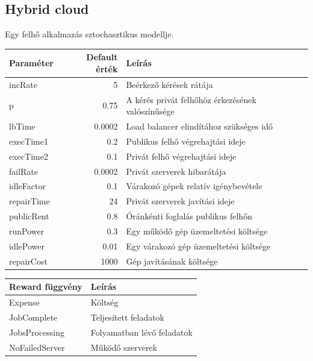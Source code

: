 \subsection{Hybrid cloud}

Egy felhő alkalmazás sztochasztikus modellje.
\begin{center}
	\begin{tabular}{lrl}
		\textbf{\textbf{Paraméter}} & \textbf{Default érték} & \textbf{Leírás} \\
		\hline
		incRate & 5& Beérkező kérések rátája\\
		p & 0.75 & A kérés privát felhőhöz érkezésének valószínűsége\\
		lbTime & 0.0002 & Load balancer elindítához szükséges idő\\
		execTime1 & 0.2 & Publikus felhő végrehajtási ideje\\
		execTime2 & 0.1 & Privát felhő végrehajtási ideje\\
		failRate & 0.0002 & Privát szerverek hibarátája\\
		idleFactor & 0.1 & Várakozó gépek relatív igénybevétele\\
		repairTime & 24 & Privát szerverek javítási ideje\\
		publicRent & 0.8 & Óránkénti foglalás publikus felhőn\\
		runPower & 0.3 & Egy működő gép üzemeltetési költsége\\
		idlePower & 0.01 & Egy várakozó gép üzemeltetési költsége\\
		repairCost & 1000 & Gép javításának költsége\\
	\end{tabular}
	\quad
	\begin{tabular}{ll}
		\textbf{\textbf{Reward függvény}} & \textbf{Leírás}\\
		\hline
		Expense & Költség\\
		JobComplete & Teljesített feladatok\\
		JobsProcessing & Folyamatban lévő feladatok\\
		NoFailedServer & Működő szerverek\\
	\end{tabular}
\end{center}

